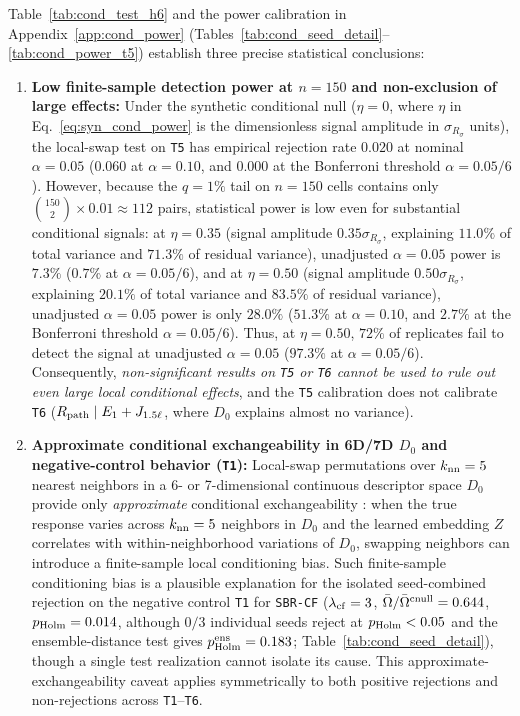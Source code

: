 \documentclass[preprint,11pt,a4paper]{elsarticle}
\begin{document}
Table~\ref{tab:cond_test_h6} and the power calibration in Appendix~\ref{app:cond_power} (Tables~\ref{tab:cond_seed_detail}--\ref{tab:cond_power_t5}) establish three precise statistical conclusions:
\begin{enumerate}
    \item \textbf{Low finite-sample detection power at $n=150$ and non-exclusion of large effects:} Under the synthetic conditional null ($\eta=0$, where $\eta$ in Eq.~\eqref{eq:syn_cond_power} is the dimensionless signal amplitude in $\sigma_{R_\sigma}$ units), the local-swap test on \texttt{T5} has empirical rejection rate $0.020$ at nominal $\alpha=0.05$ ($0.060$ at $\alpha=0.10$, and $0.000$ at the Bonferroni threshold $\alpha=0.05/6$). However, because the $q=1\%$ tail on $n=150$ cells contains only $\binom{150}{2}\times 0.01\approx 112$ pairs, statistical power is low even for substantial conditional signals: at $\eta=0.35$ (signal amplitude $0.35\sigma_{R_\sigma}$, explaining $11.0\%$ of total variance and $71.3\%$ of residual variance), unadjusted $\alpha=0.05$ power is $7.3\%$ ($0.7\%$ at $\alpha=0.05/6$), and at $\eta=0.50$ (signal amplitude $0.50\sigma_{R_\sigma}$, explaining $20.1\%$ of total variance and $83.5\%$ of residual variance), unadjusted $\alpha=0.05$ power is only $\mathbf{28.0\%}$ ($51.3\%$ at $\alpha=0.10$, and $\mathbf{2.7\%}$ at the Bonferroni threshold $\alpha=0.05/6$). Thus, at $\eta=0.50$, $72\%$ of replicates fail to detect the signal at unadjusted $\alpha=0.05$ ($97.3\%$ at $\alpha=0.05/6$). Consequently, \emph{non-significant results on \texttt{T5} or \texttt{T6} cannot be used to rule out even large local conditional effects}, and the \texttt{T5} calibration does not calibrate \texttt{T6} ($R_{\rm path}\mid E_1+J_{1.5\ell}$, where $D_0$ explains almost no variance).
    \item \textbf{Approximate conditional exchangeability in 6D/7D $D_0$ and negative-control behavior (\texttt{T1}):} Local-swap permutations over $k_{\rm nn}=5$ nearest neighbors in a 6- or 7-dimensional continuous descriptor space $D_0$ provide only \emph{approximate} conditional exchangeability \cite{Kim2022}: when the true response varies across $k_{\rm nn}=5$ neighbors in $D_0$ and the learned embedding $Z$ correlates with within-neighborhood variations of $D_0$, swapping neighbors can introduce a finite-sample local conditioning bias. Such finite-sample conditioning bias is a plausible explanation for the isolated seed-combined rejection on the negative control \texttt{T1} for \texttt{SBR-CF} ($\lambda_{\rm cf}=3$, $\bar\Omega/\bar\Omega^{\rm cnull}=0.644$, $p_{\rm Holm}=0.014$, although $0/3$ individual seeds reject at $p_{\rm Holm}<0.05$ and the ensemble-distance test gives $p_{\rm Holm}^{\rm ens}=0.183$; Table~\ref{tab:cond_seed_detail}), though a single test realization cannot isolate its cause. This approximate-exchangeability caveat applies symmetrically to both positive rejections and non-rejections across \texttt{T1}--\texttt{T6}.

\end{enumerate}
\end{document}
